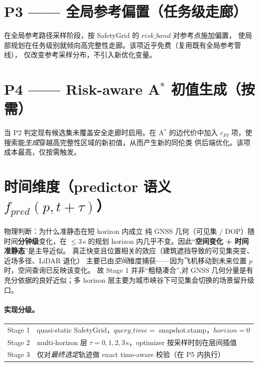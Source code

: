 \documentclass[11pt]{ctexart}
\begin{document}
\section{P3 —— 全局参考偏置（任务级走廊）}
在全局参考路径采样阶段，按 SafetyGrid 的 $risk\_band$ 对参考点施加偏置，
使局部规划在任务级别就倾向高完整性走廊。该项近乎免费（复用既有全局参考管线），
仅改变参考采样分布，不引入新优化变量。

\section{P4 —— Risk-aware A$^\ast$ 初值生成（按需）}
当 P2 判定现有候选集未覆盖安全走廊时启用。在 A$^\ast$ 的边代价中加入
$c_{PI}$ 项，使搜索能\emph{生成}穿越高完整性区域的新初值，从而产生新的同伦类
供后端优化。该项成本最高，仅按需触发。

\section{时间维度（predictor 语义 $f_{pred}(p,t+\tau)$）}

\begin{notebox}{物理判断：为什么准静态在短 horizon 内成立}
纯 GNSS 几何（可见集 / DOP）随时间\textbf{分钟级}变化，在 $\le 3$\,s 的规划
horizon 内几乎不变。因此``\textbf{空间变化 + 时间准静态}''是主导近似。
真正快变且位置相关的效应（建筑遮挡导致的可见集突变、近场多径、LiDAR 退化）
主要已由\emph{空间}维度捕获——因为飞机移动到未来位置 $p$ 时，空间查询已反映该变化。
故 Stage 1 并非``粗糙凑合'',对 GNSS 几何分量是有充分依据的良好近似；多 horizon
层主要为城市峡谷下可见集会切换的场景留升级口。
\end{notebox}

\paragraph{实现分级。}
\begin{center}\renewcommand{\arraystretch}{1.3}
\begin{tabular}{@{}ll@{}}
\toprule
Stage 1 & quasi-static SafetyGrid，$query\_time=$ snapshot.stamp，$horizon=0$\\
Stage 2 & multi-horizon 层 $\tau=0,1,2,3$\,s，optimizer 按采样时刻在层间插值\\
Stage 3 & 仅对\emph{最终选定}轨迹做 exact time-aware 校验（在 P5 内执行）\\
\bottomrule
\end{tabular}\end{center}
\end{document}
